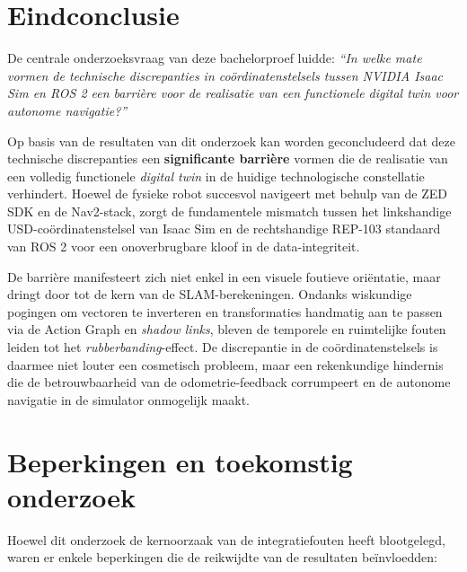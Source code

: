 \section{Eindconclusie}
\label{sec:eindconclusie}

De centrale onderzoeksvraag van deze bachelorproef luidde: \textit{``In welke mate vormen de technische discrepanties in coördinatenstelsels tussen NVIDIA Isaac Sim en ROS 2 een barrière voor de realisatie van een functionele digital twin voor autonome navigatie?''}

Op basis van de resultaten van dit onderzoek kan worden geconcludeerd dat deze technische discrepanties een \textbf{significante barrière} vormen die de realisatie van een volledig functionele \textit{digital twin} in de huidige technologische constellatie verhindert. Hoewel de fysieke robot succesvol navigeert met behulp van de ZED SDK en de Nav2-stack, zorgt de fundamentele mismatch tussen het linkshandige USD-coördinatenstelsel van Isaac Sim en de rechtshandige REP-103 standaard van ROS 2 voor een onoverbrugbare kloof in de data-integriteit.

De barrière manifesteert zich niet enkel in een visuele foutieve oriëntatie, maar dringt door tot de kern van de SLAM-berekeningen. Ondanks wiskundige pogingen om vectoren te inverteren en transformaties handmatig aan te passen via de Action Graph en \textit{shadow links}, bleven de temporele en ruimtelijke fouten leiden tot het \textit{rubberbanding}-effect. De discrepantie in de coördinatenstelsels is daarmee niet louter een cosmetisch probleem, maar een rekenkundige hindernis die de betrouwbaarheid van de odometrie-feedback corrumpeert en de autonome navigatie in de simulator onmogelijk maakt.

\section{Beperkingen en toekomstig onderzoek}
\label{sec:beperkingen_onderzoek}

Hoewel dit onderzoek de kernoorzaak van de integratiefouten heeft blootgelegd, waren er enkele beperkingen die de reikwijdte van de resultaten beïnvloedden:

